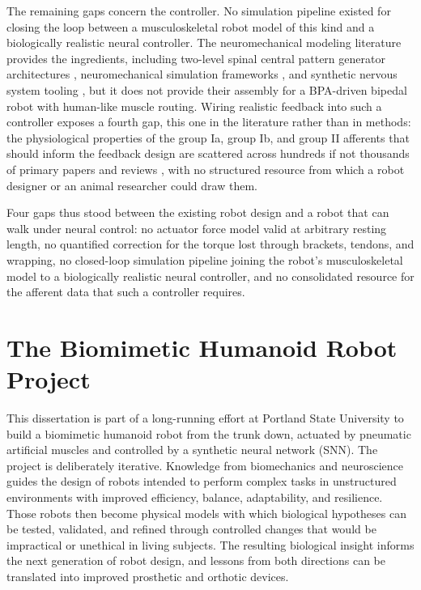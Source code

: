 The remaining gaps concern the controller. No simulation pipeline existed for closing the loop between a musculoskeletal robot model of this kind and a biologically realistic neural controller. The neuromechanical modeling literature provides the ingredients, including two-level spinal central pattern generator architectures \citep{rybak_modelling_2006, mccrea_organization_2008}, neuromechanical simulation frameworks \citep{markin_afferent_2010}, and synthetic nervous system tooling \citep{nourse_sns_2023}, but it does not provide their assembly for a BPA-driven bipedal robot with human-like muscle routing. Wiring realistic feedback into such a controller exposes a fourth gap, this one in the literature rather than in methods: the physiological properties of the group Ia, group Ib, and group II afferents that should inform the feedback design are scattered across hundreds if not thousands of primary papers and reviews \citep{van_de_crommert_review_1998, windhorst_muscle_2007, windhorst_spinal_2022}, with no structured resource from which a robot designer or an animal researcher could draw them.

Four gaps thus stood between the existing robot design and a robot that can walk under neural control: no actuator force model valid at arbitrary resting length, no quantified correction for the torque lost through brackets, tendons, and wrapping, no closed-loop simulation pipeline joining the robot's musculoskeletal model to a biologically realistic neural controller, and no consolidated resource for the afferent data that such a controller requires.

\section{The Biomimetic Humanoid Robot Project}\label{sec:project}

This dissertation is part of a long-running effort at Portland State University to build a biomimetic humanoid robot from the trunk down, actuated by pneumatic artificial muscles and controlled by a synthetic neural network (SNN). The project is deliberately iterative. Knowledge from biomechanics and neuroscience guides the design of robots intended to perform complex tasks in unstructured environments with improved efficiency, balance, adaptability, and resilience. Those robots then become physical models with which biological hypotheses can be tested, validated, and refined through controlled changes that would be impractical or unethical in living subjects. The resulting biological insight informs the next generation of robot design, and lessons from both directions can be translated into improved prosthetic and orthotic devices.

